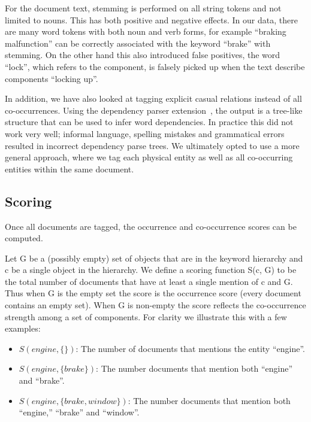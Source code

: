For the document text, stemming is performed on all string tokens and not
limited to nouns. This has both positive and negative effects. In our data, 
there are many word tokens with both noun and verb forms, for example ``braking
malfunction'' can be correctly associated with the keyword ``brake'' with
stemming. On the other hand this also introduced false positives, the word
``lock'', which refers to the component, is falsely picked up when the text describe components
``locking up''.

In addition, we have also looked at tagging explicit casual relations instead of 
all co-occurrences. Using the dependency parser extension~\cite{Marneffe2006}, 
the output is a tree-like structure that can be used to infer
word dependencies. In practice this did not work very well; informal language,
spelling mistakes and grammatical errors resulted in incorrect dependency parse
trees. We ultimately opted to use a more general approach, where we tag each
physical entity as well as all co-occurring entities within the same document.


\subsection{Scoring}
Once all documents are tagged, the occurrence and co-occurrence scores can be
computed. 

Let G be a (possibly empty) set of objects that are in the keyword hierarchy and
c be a single object in the hierarchy. We define a scoring function S(c, G) to be 
the total number of documents that have at least a single mention of c and G. Thus 
when G is the empty set the score is the occurrence score (every document 
contains an empty set). When G is non-empty the score reflects the co-occurrence 
strength among a set of components. For clarity we illustrate this with a few examples:
\begin{itemize} [noitemsep]
  \item $S(engine, \{\})$: The number of documents that mentions the entity
  ``engine''.
  
  
  \item $S(engine, \{brake\})$: The number documents that mention both
  ``engine'' and ``brake''. 
  
  \item $S(engine, \{brake, window\})$: The number documents that mention both
  ``engine,'' ``brake'' and ``window''. 
\end{itemize}

